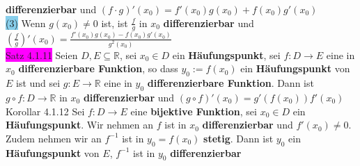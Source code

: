 \documentclass[landscape, 10pt]{article}
\newcommand{\R}{\mathbb{R}}
\begin{document}
\begin{multicols}{3}
                            \textbf{differenzierbar} und 
                            \textcolor{NavyBlue}{
                            $(f\cdot g)'(x_0)=f'(x_0)g(x_0)+f(x_0)g'(x_0)$}\\
                     \colorbox{SkyBlue}{(3)} Wenn 
                            \textcolor{NavyBlue}{$g(x_0)\neq0$} ist, ist 
                            \textcolor{NavyBlue}{$\frac{f}{g}$} in 
                            \textcolor{NavyBlue}{$x_0$} \textbf{differenzierbar} und 
                            \textcolor{NavyBlue}{
                            $(\frac{f}{g})'(x_0)
                            =\frac{f'(x_0)g(x_0)-f(x_0)g'(x_0)}{g^2(x_0)}$} \\
              \colorbox{magenta}{Satz 4.1.11}
                     Seien \textcolor{NavyBlue}{$D,E\subseteq\R$}, 
                     sei \textcolor{NavyBlue}{$x_0\in D$}
                     ein \textbf{Häufungspunkt}, sei 
                     \textcolor{NavyBlue}{$f:D\longrightarrow E$}
                     eine in \textcolor{NavyBlue}{$x_0$}
                     \textbf{differenzierbare Funktion}, so dass 
                     \textcolor{NavyBlue}{$y_0:=f(x_0)$} ein 
                     \textbf{Häufungspunkt} von \textcolor{NavyBlue}{$E$} ist und 
                     sei \textcolor{NavyBlue}{$g:E\longrightarrow\R$} eine in 
                     \textcolor{NavyBlue}{$y_0$} 
                     \textbf{differenzierbare Funktion}. Dann ist 
                     \textcolor{NavyBlue}{$g\circ f:D\longrightarrow\R$} in 
                     \textcolor{NavyBlue}{$x_0$} \textbf{differenzierbar} und 
                     \textcolor{NavyBlue}{$(g\circ f)'(x_0)=g'(f(x_0))f'(x_0)$}\\
              \colorbox{BurntOrange}{Korollar 4.1.12}
                     Sei \textcolor{NavyBlue}{$f:D\longrightarrow E$} eine 
                     \textbf{bijektive Funktion}, sei 
                     \textcolor{NavyBlue}{$x_0\in D$} ein \textbf{Häufungspunkt}. 
                     Wir nehmen an \textcolor{NavyBlue}{$f$} ist 
                     in \textcolor{NavyBlue}{$x_0$} \textbf{differenzierbar} und 
                     \textcolor{NavyBlue}{$f'(x_0)\neq0$}. Zudem nehmen 
                     wir an \textcolor{NavyBlue}{$f^{-1}$} ist in \textcolor{NavyBlue}{$y_0=f(x_0)$}
                     \textbf{stetig}. Dann ist \textcolor{NavyBlue}{$y_0$} ein 
                     \textbf{Häufungspunkt} von \textcolor{NavyBlue}{$E$}, 
                     \textcolor{NavyBlue}{$f^{-1}$} ist in \textcolor{NavyBlue}{$y_0$} 
                     \textbf{differenzierbar} 

\end{multicols}
\end{document}
